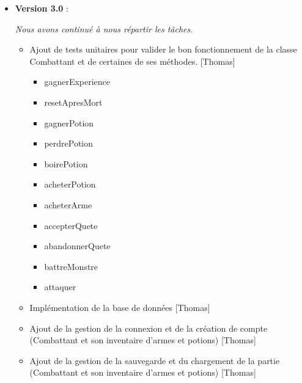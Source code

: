 \documentclass{article}
\begin{document}
\begin{itemize}
    \textit{Nous nous sommes attribués des tâches à faire chacun de note côté. Pour chaque cas ci-dessous, les informations sur qui a fait quoi sont indiquées, avec informations supplémentaires.}
    \begin{itemize}
      \item Ajout de commentaires et de docstrings pour améliorer la lisibilité du code. [Thomas]
      \item Mise en place du systeme MVC pour séparer la logique métier et l'interface utilisateur à l'aide d'un contrôleur. [Thomas]
      \item Ajout de l'interface graphique avec Tkinter pour améliorer l'expérience utilisateur. [Léandre. Avec l'aide de Thomas pour lier au contrôleur]
      \item Création aléatoire des quêtes et des monstres dans les donjons. [Thomas]
      \item Ajout de la gestion des niveaux de difficulté des quêtes et des monstres. [Thomas]
      \item Implémentation du forgeron et achat d'arme [Thomas]
      \item Implémentation du médecin et achat de potions [Thomas]
      \item Ajout d'images personnalisées pour les armes. [Léandre]
    \end{itemize}
    
    \item \textbf{Version 3.0} :
    
    \textit{Nous avons continué à nous répartir les tâches.}
    \begin{itemize}
      \item Ajout de tests unitaires pour valider le bon fonctionnement de la classe Combattant et de certaines de ses méthodes. [Thomas]
      \begin{itemize}
        \item gagnerExperience
        \item resetApresMort
        \item gagnerPotion
        \item perdrePotion
        \item boirePotion
        \item acheterPotion
        \item acheterArme
        \item accepterQuete
        \item abandonnerQuete
        \item battreMonstre
        \item attaquer
      \end{itemize}
      \item Implémentation de la base de données [Thomas]
      \item Ajout de la gestion de la connexion et de la création de compte (Combattant et son inventaire d'armes et potions) [Thomas]
      \item Ajout de la gestion de la sauvegarde et du chargement de la partie (Combattant et son inventaire d'armes et potions) [Thomas]
    \end{itemize}
\end{itemize}
    
\end{document}
